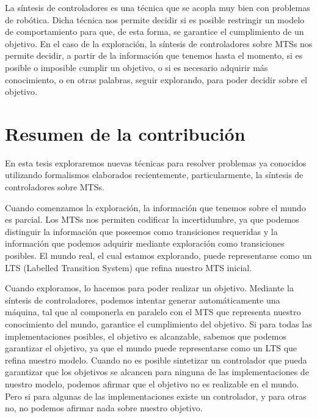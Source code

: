 \vspace{\baselineskip}
La síntesis de controladores es una técnica que se acopla muy bien con problemas de robótica. Dicha técnica nos permite 
decidir si es posible restringir un modelo de comportamiento para que, de esta forma, se garantice el cumplimiento
de un objetivo. En el caso de la exploración, la síntesis de controladores sobre MTSs nos permite decidir, a partir 
de la información que tenemos hasta el momento, si es posible o imposible cumplir un objetivo, o si es necesario adquirir 
más conocimiento, o en otras palabras, seguir explorando, para poder decidir sobre el objetivo.

\section{Resumen de la contribución}

En esta tesis exploraremos nuevas técnicas para resolver problemas ya conocidos utilizando formalismos elaborados recientemente,
particularmente, la síntesis de controladores sobre MTSs.

\vspace{\baselineskip}
Cuando comenzamos la exploración, la información que tenemos sobre el mundo es parcial. Los MTSs nos permiten codificar 
la incertidumbre, ya que podemos distinguir la información que poseemos como transiciones requeridas y la información 
que podemos adquirir mediante exploración como transiciones posibles. El mundo real, el cual estamos explorando, puede 
representarse como un LTS (Labelled Transition System) que refina nuestro MTS inicial.

\vspace{\baselineskip}
Cuando exploramos, lo hacemos para poder realizar un objetivo. Mediante la síntesis de controladores, podemos intentar 
generar automáticamente una máquina, tal que al componerla en paralelo con el MTS que representa nuestro conocimiento 
del mundo, garantice el cumplimiento del objetivo. 
Si para todas las implementaciones posibles, el objetivo es alcanzable, sabemos que podemos garantizar el objetivo, ya 
que el mundo puede representarse como un LTS que refina nuestro modelo. 
Cuando no es posible sintetizar un controlador que pueda garantizar que los objetivos se alcancen para ninguna de las 
implementaciones de nuestro modelo, podemos afirmar que el objetivo no es realizable en el mundo. Pero si para algunas 
de las implementaciones existe un controlador, y para otras no, no podemos afirmar nada sobre nuestro objetivo.

